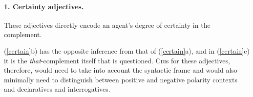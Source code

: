 \documentclass[10pt]{article}
\begin{document}
\vspace{-.2in}
\paragraph{1. Certainty adjectives.} \hspace{-.1in}These adjectives directly encode an agent's degree of certainty in the complement.

\vspace{-0.6em}
 \vspace{-0.6em} 
(\ref{certain}b) has the opposite inference from that of
 (\ref{certain}a), and 
in (\ref{certain}c) it is the
 \textit{that}-complement itself that is questioned. 
C\textsc{di}s for these adjectives, therefore, would need to take into account the syntactic frame and would also minimally need to distinguish between positive and negative polarity contexts and declaratives and interrogatives.
\end{document}
